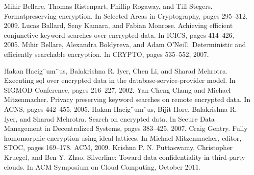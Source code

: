 \documentclass[11pt,onecolumn]{article}
\begin{document}
\begin{thebibliography}{1}
\small

 Mihir Bellare, Thomas Ristenpart, Phillip Rogaway, and Till Stegers. Formatpreserving
encryption. In Selected Areas in Cryptography, pages 295–312, 2009.
 Lucas Ballard, Seny Kamara, and Fabian Monrose. Achieving efficient conjunctive
 keyword searches over encrypted data. In ICICS, pages 414–426, 2005.
 Mihir Bellare, Alexandra Boldyreva, and Adam O’Neill. Deterministic and efficiently
searchable encryption. In CRYPTO, pages 535–552, 2007.

Hakan Hacig¨um¨us, Balakrishna R. Iyer, Chen Li, and Sharad Mehrotra. Executing
sql over encrypted data in the database-service-provider model. In SIGMOD
Conference, pages 216–227, 2002.
 Yan-Cheng Chang and Michael Mitzenmacher. Privacy preserving keyword
searches on remote encrypted data. In ACNS, pages 442–455, 2005.
 Hakan Hacig¨um¨us, Bijit Hore, Balakrishna R. Iyer, and Sharad Mehrotra. Search
on encrypted data. In Secure Data Management in Decentralized Systems, pages
383–425. 2007.
 Craig Gentry. Fully homomorphic encryption using ideal lattices. In Michael
Mitzenmacher, editor, STOC, pages 169–178. ACM, 2009.
 Krishna P. N. Puttaswamy, Christopher Kruegel, and Ben Y. Zhao. Silverline:
Toward data confidentiality in third-party clouds. In ACM Symposium on Cloud
Computing, October 2011.

\end{thebibliography}
\end{document}
